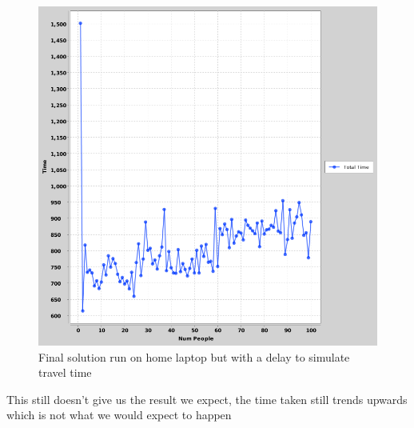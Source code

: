 \documentclass[a4paper, 12pt]{article}
\begin{document}
			\begin{figure}[H]
				\centering
				\includegraphics[scale=0.4]{numpeople-vs-time(home-laptop-w-delay)}
				\caption{Final solution run on home laptop but with a delay to simulate travel time}
			\end{figure}
	
			This still doesn't give us the result we expect, the time taken still trends upwards which is not what we would expect to happen
		
\end{document}
